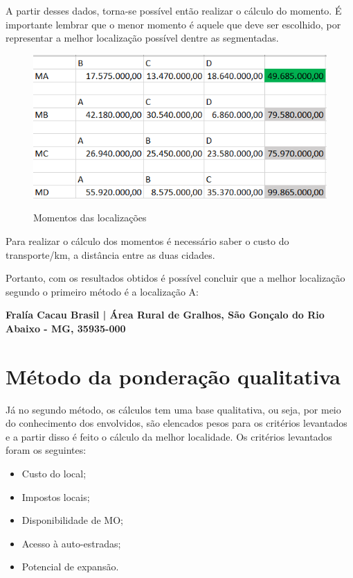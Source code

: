 \documentclass[
	12pt,				%
	openright,			%
	oneside,			%
	a4paper,			%
	english,			%
	french,				%
	spanish,			%
	brazil				%
	]{abntex2}
\begin{document}
A partir desses dados, torna-se possível então realizar o cálculo do momento. É importante lembrar que o menor momento é aquele que deve ser escolhido, por representar a melhor localização possível dentre as segmentadas.

\begin{figure}[H]
\begin{center}
\caption{Momentos das localizações}
\includegraphics[scale=0.6]{../../Pictures/tabela3.png} 
\label{loca}
\end{center}
\end{figure}

Para realizar o cálculo dos momentos é necessário saber o custo do transporte/km, a distância entre as duas cidades.
	
Portanto, com os resultados obtidos é possível concluir que a melhor localização segundo o primeiro método é a localização A: 

\begin{center}
\textbf{Fralía Cacau Brasil | Área Rural de Gralhos, São Gonçalo do Rio Abaixo - MG, 35935-000}
\end{center}

\section{Método da ponderação qualitativa}

Já no segundo método, os cálculos tem uma base qualitativa, ou seja, por meio do conhecimento dos envolvidos, são elencados pesos para os critérios levantados e a partir disso é feito o cálculo da melhor localidade. Os critérios levantados foram os seguintes:

\begin{itemize}
\item Custo do local;
\item Impostos locais;
\item Disponibilidade de MO;
\item Acesso à auto-estradas;
\item Potencial de expansão.
\end{itemize}
\end{document}

